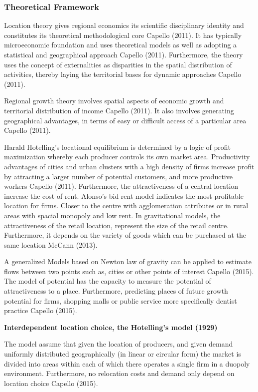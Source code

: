 \documentclass[
  10,
  a4paper,
]{article}
\begin{document}
\hypertarget{theoretical-framework}{%
\subsubsection{Theoretical Framework}\label{theoretical-framework}}

Location theory gives regional economics its scientific disciplinary
identity and constitutes its theoretical methodological core Capello
(2011). It has typically microeconomic foundation and uses theoretical
models as well as adopting a statistical and geographical approach
Capello (2011). Furthermore, the theory uses the concept of
externalities as disparities in the spatial distribution of activities,
thereby laying the territorial bases for dynamic approaches Capello
(2011).

Regional growth theory involves spatial aspects of economic growth and
territorial distribution of income Capello (2011). It also involves
generating geographical advantages, in terms of easy or difficult access
of a particular area Capello (2011).

Harald Hotelling's locational equilibrium is determined by a logic of
profit maximization whereby each producer controls its own market area.
Productivity advantages of cities and urban clusters with a high density
of firms increase profit by attracting a larger number of potential
customers, and more productive workers Capello (2011). Furthermore, the
attractiveness of a central location increase the cost of rent. Alonso's
bid rent model indicates the most profitable location for firms. Closer
to the centre with agglomeration attributes or in rural areas with
spacial monopoly and low rent. In gravitational models, the
attractiveness of the retail location, represent the size of the retail
centre. Furthermore, it depends on the variety of goods which can be
purchased at the same location McCann (2013).

A generalized Models based on Newton law of gravity can be applied to
estimate flows between two points such as, cities or other points of
interest Capello (2015). The model of potential has the capacity to
measure the potential of attractiveness to a place. Furthermore,
predicting places of future growth potential for firms, shopping malls
or public service more specifically dentist practice Capello (2015).

\textbf{Interdependent location choice, the Hotelling's model (1929)}

The model assume that given the location of producers, and given demand
uniformly distributed geographically (in linear or circular form) the
market is divided into areas within each of which there operates a
single firm in a duopoly environment. Furthermore, no relocation costs
and demand only depend on location choice Capello (2015).
\end{document}
